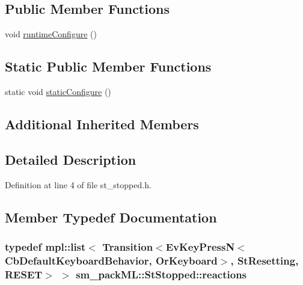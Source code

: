 \subsection*{Public Member Functions}
\begin{DoxyCompactItemize}
\item 
void \hyperlink{structsm__packML_1_1StStopped_a59f9f875b5f24cf0ef2f607b230582eb}{runtime\+Configure} ()
\end{DoxyCompactItemize}
\subsection*{Static Public Member Functions}
\begin{DoxyCompactItemize}
\item 
static void \hyperlink{structsm__packML_1_1StStopped_a8dd4d55800d1eaae7a27375b46f2b508}{static\+Configure} ()
\end{DoxyCompactItemize}
\subsection*{Additional Inherited Members}


\subsection{Detailed Description}


Definition at line 4 of file st\+\_\+stopped.\+h.



\subsection{Member Typedef Documentation}
\subsubsection[{\texorpdfstring{reactions}{reactions}}]{\setlength{\rightskip}{0pt plus 5cm}typedef mpl\+::list$<$ Transition$<$Ev\+Key\+PressN$<$Cb\+Default\+Keyboard\+Behavior, {\bf Or\+Keyboard}$>$, {\bf St\+Resetting}, {\bf R\+E\+S\+ET}$>$ $>$ {\bf sm\+\_\+pack\+M\+L\+::\+St\+Stopped\+::reactions}}\hypertarget{structsm__packML_1_1StStopped_aabf80c9d33d70267864a8f17c2813aa7}{}\label{structsm__packML_1_1StStopped_aabf80c9d33d70267864a8f17c2813aa7}


